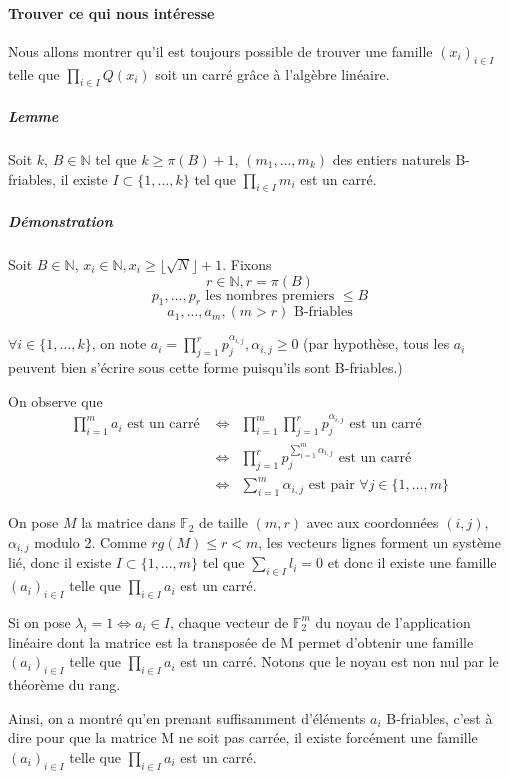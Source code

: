 \documentclass[11pt,a4paper]{article}
\begin{document}
	\paragraph{Trouver ce qui nous intéresse}
	Nous allons montrer qu'il est toujours possible de trouver une famille $(x_i)_{i \in I}$ telle que $\prod_{i \in I} Q(x_i)$ soit un carré grâce à l'algèbre linéaire.

	\subparagraph{Lemme}
		Soit $k$, $B \in \mathbb{N}$ tel que $k \ge \pi(B) + 1$, $(m_1, ..., m_k)$ des entiers naturels B-friables,
		il existe $I \subset \{1, ..., k\}$ tel que $\prod_{i \in I} m_i$ est un carré.
		
	\subparagraph{Démonstration}
	Soit $B \in \mathbb{N}$, $x_i \in \mathbb{N}, x_i \ge \lfloor \sqrt{N} \rfloor +1$. Fixons 
	$$r \in \mathbb{N}, r = \pi(B)$$
	$$p_1, ..., p_r \text{ les nombres premiers } \le B$$
	$$a_1, ..., a_m , (m>r) \text{ B-friables}$$
	
	$\forall i \in \{1, ..., k\}$, on note $a_i = \prod_{j=1}^r p_j^{\alpha_{i,j}}, \alpha_{i,j} \ge 0$ (par hypothèse, tous les $a_i$ peuvent bien s'écrire sous cette forme puisqu'ils sont B-friables.)
	
	On observe que 
	\begin{eqnarray*}
		\prod_{i=1}^m a_i \text{ est un carré }  &\iff& \prod_{i=1}^m \prod_{j=1}^r p_j^{\alpha_{i,j}} \text{ est un carré} \\
		&\iff& \prod_{j=1}^r p_j^{\sum_{i=1}^m \alpha_{i,j}} \text{ est un carré } \\
		&\iff& \sum_{i=1}^m \alpha_{i,j} \text{ est pair } \forall j \in \{1, ..., m\}
	\end{eqnarray*}
	
	On pose $M$ la matrice dans $\mathbb{F}_2$ de taille $(m,r)$ avec aux coordonnées $(i,j)$,  $\alpha_{i,j}$ modulo 2. 
	Comme $rg(M) \le r < m$, les vecteurs lignes forment un système lié, donc il existe $I \subset \{1, ..., m\}$ tel que $\sum_{i \in I} l_i = 0$ et donc il existe une famille $(a_i)_{i \in I}$ telle que $\prod_{i \in I} a_i$ est un carré. 
	
	Si on pose $\lambda_i = 1 \iff a_i \in I$, chaque vecteur de $\mathbb{F}_2^{m}$  du noyau de l'application linéaire dont la matrice est la transposée de M permet d'obtenir une famille $(a_i)_{i \in I}$ telle que $\prod_{i \in I} a_i$ est un carré. Notons que le noyau est non nul par le théorème du rang.
	
	
	Ainsi, on a montré qu'en prenant suffisamment d'éléments $a_i$ B-friables, c'est à dire pour que la matrice M ne soit pas carrée, il existe forcément une famille $(a_i)_{i \in I}$ telle que $\prod_{i \in I} a_i$ est un carré.
	
\end{document}
